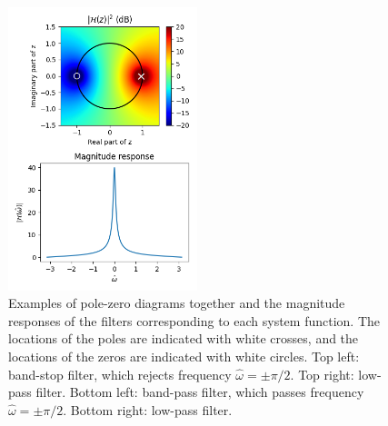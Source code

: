 \begin{figure}
\begin{center}
\includegraphics[width=0.49\textwidth]{code/026_iir/ex4.png}
\end{center}
\caption{Examples of pole-zero diagrams together and the magnitude responses of the filters corresponding to each system function. The locations of the poles are indicated with white crosses, and the locations of the zeros are indicated with white circles. Top left: band-stop filter, which rejects frequency $\hat{\omega}=\pm\pi/2$. Top right: low-pass filter. Bottom left: band-pass filter, which passes frequency $\hat{\omega}=\pm \pi/2$. Bottom right: low-pass filter.}
\label{fig:pz_examples}
\end{figure}

